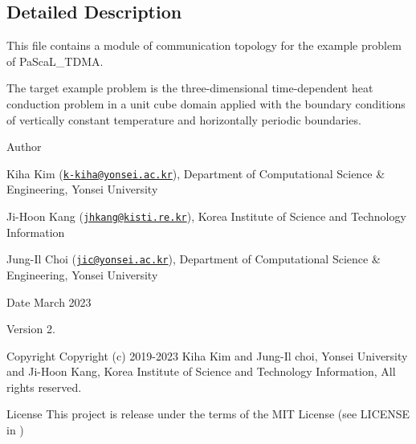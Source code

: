 \subsection{Detailed Description}
This file contains a module of communication topology for the example problem of Pa\+Sca\+L\+\_\+\+T\+D\+MA. 

The target example problem is the three-\/dimensional time-\/dependent heat conduction problem in a unit cube domain applied with the boundary conditions of vertically constant temperature and horizontally periodic boundaries. \begin{DoxyAuthor}{Author}

\begin{DoxyItemize}
\item Kiha Kim (\href{mailto:k-kiha@yonsei.ac.kr}{\tt k-\/kiha@yonsei.\+ac.\+kr}), Department of Computational Science \& Engineering, Yonsei University
\item Ji-\/\+Hoon Kang (\href{mailto:jhkang@kisti.re.kr}{\tt jhkang@kisti.\+re.\+kr}), Korea Institute of Science and Technology Information
\item Jung-\/\+Il Choi (\href{mailto:jic@yonsei.ac.kr}{\tt jic@yonsei.\+ac.\+kr}), Department of Computational Science \& Engineering, Yonsei University
\end{DoxyItemize}
\end{DoxyAuthor}
\begin{DoxyDate}{Date}
March 2023 
\end{DoxyDate}
\begin{DoxyVersion}{Version}
2. 
\end{DoxyVersion}
\begin{DoxyParagraph}{Copyright}
Copyright (c) 2019-\/2023 Kiha Kim and Jung-\/\+Il choi, Yonsei University and Ji-\/\+Hoon Kang, Korea Institute of Science and Technology Information, All rights reserved. 
\end{DoxyParagraph}
\begin{DoxyParagraph}{License }
This project is release under the terms of the M\+IT License (see L\+I\+C\+E\+N\+SE in ) 
\end{DoxyParagraph}

